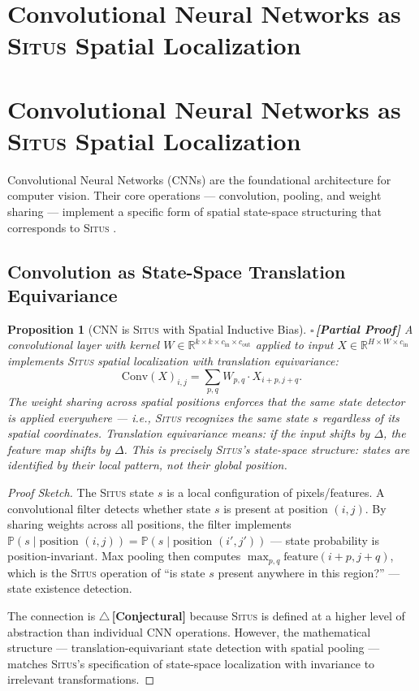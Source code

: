 \documentclass[12pt,a4paper]{article}
\newtheorem{proposition}[theorem]{Proposition}
\theoremstyle{definition}
\newcommand{\rigorPartial}{{\color{rigorcolor}$\square$\,\textbf{[Partial Proof]}}}
\newcommand{\rigorConjectural}{{\color{red!70!black}$\triangle$\,\textbf{[Conjectural]}}}
\newcommand{\Situs}{\textsc{Situs}}
\newcommand{\R}{\mathbb{R}}
\newcommand{\Pbb}{\mathbb{P}}
\begin{document}
\section{Convolutional Neural Networks as \Situs{} Spatial Localization}
\section{Convolutional Neural Networks as \Situs{} Spatial Localization}
\label{sec:cnn}

Convolutional Neural Networks (CNNs) are the foundational architecture for computer vision. Their core operations — convolution, pooling, and weight sharing — implement a specific form of spatial state-space structuring that corresponds to \Situs{} .

\subsection{Convolution as State-Space Translation Equivariance}

\begin{proposition}[CNN is \Situs{} with Spatial Inductive Bias]\label{prop:cnn_situs}
\rigorPartial
A convolutional layer with kernel $W \in \R^{k \times k \times c_{\text{in}} \times c_{\text{out}}}$ applied to input $X \in \R^{H \times W \times c_{\text{in}}}$ implements \Situs{} spatial localization with translation equivariance:
\begin{equation}\label{eq:cnn_situs}
    \text{Conv}(X)_{i,j} = \sum_{p,q} W_{p,q} \cdot X_{i+p, j+q}.
\end{equation}
The weight sharing across spatial positions enforces that the same state detector is applied everywhere — i.e., \Situs{} recognizes the same state $s$ regardless of its spatial coordinates. Translation equivariance means: if the input shifts by $\Delta$, the feature map shifts by $\Delta$. This is precisely \Situs{}'s state-space structure: states are identified by their \emph{local pattern}, not their global position.
\end{proposition}

\begin{proof}[Proof Sketch]
The \Situs{} state $s$ is a local configuration of pixels/features. A convolutional filter detects whether state $s$ is present at position $(i,j)$. By sharing weights across all positions, the filter implements $\Pbb(s \mid \text{position } (i,j)) = \Pbb(s \mid \text{position } (i',j'))$ — state probability is position-invariant. Max pooling then computes $\max_{p,q} \text{feature}(i+p, j+q)$, which is the \Situs{} operation of ``is state $s$ present anywhere in this region?'' — state existence detection.

The connection is \rigorConjectural{} because \Situs{} is defined at a higher level of abstraction than individual CNN operations. However, the mathematical structure — translation-equivariant state detection with spatial pooling — matches \Situs{}'s specification of state-space localization with invariance to irrelevant transformations.
\end{proof}
\end{document}
